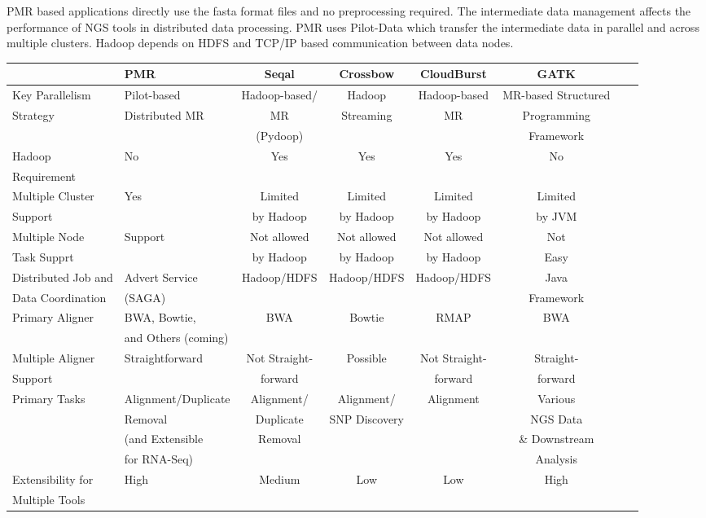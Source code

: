 \documentclass{acm_proc_article-sp}
\begin{document}
PMR based applications directly use the fasta format files and no
preprocessing required.  The intermediate data management affects the
performance of NGS tools in distributed data processing. PMR uses
Pilot-Data which transfer the intermediate data in parallel and across
multiple clusters. Hadoop depends on HDFS and TCP/IP based
communication between data nodes.

\begin{center}
\begin{table}[ht]
{\small
\hfill{}
\begin{tabular}{|l|l|c|c|c|c|c|c|}
\hline
  &\centering \textbf{PMR}\cite{pmr2012} & \textbf{Seqal}\cite{seal2011} & \textbf{Crossbow}\cite{langmead2009} & \textbf{CloudBurst}\cite{cloudburst} & \textbf{GATK}\cite{gatk} \\ \hline
 \hline 
 Key Parallelism   & Pilot-based   &  Hadoop-based/  &  Hadoop   & Hadoop-based & MR-based Structured \\ 
Strategy  & Distributed MR & MR  & Streaming  & MR & Programming  \\
& & (Pydoop) &  & & Framework \\ \hline
  
Hadoop & No & Yes & Yes\footnote[1] & Yes & No \\ 
Requirement  & & & &  &\\ \hline  
    
Multiple  Cluster & Yes  & Limited   & Limited  & Limited  & Limited \\
Support &  & by Hadoop &  by Hadoop & by Hadoop  & by JVM   \\ \hline

Multiple Node & Support & Not allowed  & Not allowed  & Not allowed & Not  \\
Task Supprt &  & by Hadoop & by Hadoop & by Hadoop & Easy  \\ \hline
Distributed Job and  & Advert Service  & Hadoop/HDFS & Hadoop/HDFS & Hadoop/HDFS & Java \\ 
Data Coordination &(SAGA) &  & & & Framework\\ \hline


Primary Aligner &  BWA, Bowtie,  &  BWA & Bowtie & RMAP &  BWA \\
& and Others (coming) &  &  &  &  \\ \hline
Multiple Aligner  & Straightforward & Not Straight- & Possible & Not Straight-  & Straight-  \\ 
Support &  & forward &   & forward  & forward \\\hline
Primary Tasks & Alignment/Duplicate  & Alignment/ & Alignment/ & Alignment &Various\\
  &  Removal & Duplicate & SNP Discovery & & NGS Data  \\  
           & (and Extensible &  Removal & &  & \& Downstream  \\
           & for RNA-Seq) & & &  & Analysis \\ \hline  
Extensibility for   &  High  & Medium &  Low & Low & High      \\
Multiple Tools  &      &  &  &  &   \\ \hline


\end{tabular}}
\end{table}
\end{center}
\end{document}
